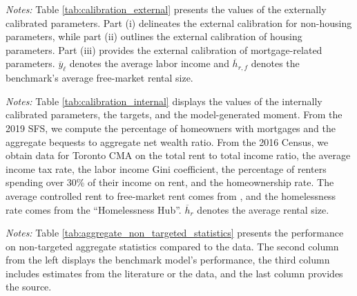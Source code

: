 \documentclass[parskip=full]{article}
\newenvironment{fignote2}[1]
{
\par
\medskip
\begin{minipage}{#1}
\footnotesize
}
{
\end{minipage}
}
\begin{document}



\vspace{1cm}

\begin{table}[H]
    \centering
    \caption{Externally assigned parameter values}
    \label{tab:calibration_external}
    
    \begin{fignote2}{1.02\textwidth}
    \textit{Notes:} Table \ref{tab:calibration_external} presents the values of the externally calibrated parameters. Part (i) delineates the external calibration for non-housing parameters, while part (ii) outlines the external calibration of housing parameters. Part (iii) provides the external calibration of mortgage-related parameters. $\overline{y}_{\ell}$ denotes the average labor income and $\overline{h}_{r,f}$ denotes the benchmark's average free-market rental size.
    \end{fignote2}
\end{table}

\begin{table}[H]
    \centering
    \caption{Internally calibrated parameter values}
    \label{tab:calibration_internal}
    
    \begin{fignote2}{1.03\textwidth}
    \textit{Notes:} Table \ref{tab:calibration_internal} displays the values of the internally calibrated parameters, the targets, and the model-generated moment. From the 2019 SFS, we compute the percentage of homeowners with mortgages and the aggregate bequests to aggregate net wealth ratio. From the 2016 Census, we obtain data for Toronto CMA on the total rent to total income ratio, the average income tax rate, the labor income Gini coefficient, the percentage of renters spending over 30\% of their income on rent, and the homeownership rate. The average controlled rent to free-market rent comes from \citet{zhang-gou}, and the homelessness rate comes from the ``Homelessness Hub''. $\overline{h}_{r}$ denotes the average rental size.
    \end{fignote2}
\end{table}

\begin{table}[H]
    \centering
    \caption{Aggregate non-targeted statistics}
    \label{tab:aggregate_non_targeted_statistics}  
    \begin{fignote2}{0.84\textwidth}
      \textit{Notes:} Table \ref{tab:aggregate_non_targeted_statistics} presents the performance on non-targeted aggregate statistics compared to the data. The second column from the left displays the benchmark model's performance, the third column includes estimates from the literature or the data, and the last column provides the source.
    \end{fignote2}
\end{table}
\end{document}
